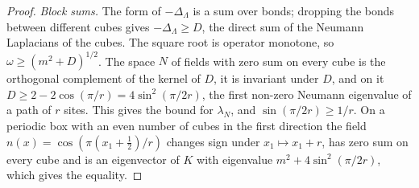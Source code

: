 \begin{proof}
\emph{Block sums.} The form of $-\Delta_\Lambda$ is a sum over bonds; dropping the bonds between different
cubes gives $-\Delta_\Lambda\ge D$, the direct sum of the Neumann Laplacians of the cubes. The square root is
operator monotone, so $\omega\ge(m^2+D)^{1/2}$. The space $N$ of fields with zero sum on every cube is the
orthogonal complement of the kernel of $D$, it is invariant under $D$, and on it
$D\ge2-2\cos(\pi/r)=4\sin^2(\pi/2r)$, the first non-zero Neumann eigenvalue of a path of $r$ sites. This
gives the bound for $\lambda_N$, and $\sin(\pi/2r)\ge1/r$. On a periodic box with an even number of cubes in
the first direction the field $n(x)=\cos(\pi(x_1+\tfrac12)/r)$ changes sign under $x_1\mapsto x_1+r$, has
zero sum on every cube and is an eigenvector of $K$ with eigenvalue $m^2+4\sin^2(\pi/2r)$, which gives the
equality.
\end{proof}


